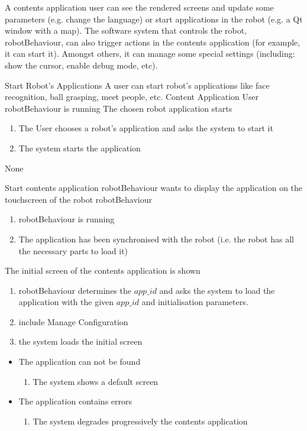 A contents application user can see the rendered screens and update some parameters (e.g. change the language) or start applications in the robot (e.g. a Qt window with a map).
The software system that controls the robot, robotBehaviour, can also trigger actions in the contents application (for example, it can start it).
Amongst others, it can manage some special settings (including: show the cursor, enable debug mode, etc). 

\begin{suc}
{Start Robot's Applications}
{A user can start robot's applications like face recognition, ball grasping, meet people, etc.}
{Content Application User}
{robotBehaviour is running}
{The chosen robot application starts}
{
    \begin{enumerate}
        \item The User chooses a robot's application and asks the system to start it
        \item The system starts the application
    \end{enumerate}
}
{None}
\end{suc}

\begin{suc}
{Start contents application}
{robotBehaviour wants to display the application on the touchscreen of the robot}
{robotBehaviour}
{
	\begin{enumerate}
        \item robotBehaviour is running
        \item The application has been synchronised with the robot (i.e. the robot has all the necessary parts to load it)
    \end{enumerate}
}
{
The initial screen of the contents application is shown
}
{
    \begin{enumerate}
        \item robotBehaviour determines the $app\_id$ and asks the system to load the application with the given $app\_id$ and initialisation parameters.
        \item include Manage Configuration
		\item the system loads the initial screen
    \end{enumerate}
}
{    
	\begin{itemize}
        \item The application can not be found
        \begin{enumerate}
        	\item The system shows a default screen
    	\end{enumerate}
    	\item The application contains errors
        \begin{enumerate}
        	\item The system degrades progressively the contents application
    	\end{enumerate}
    \end{itemize}    
}
\end{suc}


